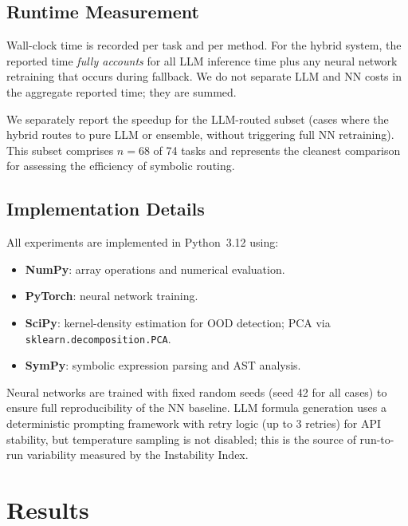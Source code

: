 \documentclass[twoside,11pt]{article}
\begin{document}
\subsection{Runtime Measurement}\label{subsec:runtime-measurement}
\label{sec:timing_setup}

Wall-clock time is recorded per task and per method.  For the hybrid system,
the reported time \emph{fully accounts} for all LLM inference time plus any
neural network retraining that occurs during fallback.  We do not separate
LLM and NN costs in the aggregate reported time; they are summed.

We separately report the speedup for the LLM-routed subset (cases where the
hybrid routes to pure LLM or ensemble, without triggering full NN retraining).
This subset comprises $n=68$ of 74 tasks and represents the cleanest comparison
for assessing the efficiency of symbolic routing.

\subsection{Implementation Details}\label{subsec:implementation-details}
\label{sec:setup_impl}

All experiments are implemented in Python~3.12 using:
\begin{itemize}
  \item \textbf{NumPy}: array operations and numerical evaluation.
  \item \textbf{PyTorch}: neural network training.
  \item \textbf{SciPy}: kernel-density estimation for OOD detection; PCA via
    \texttt{sklearn.decomposition.PCA}.
  \item \textbf{SymPy}: symbolic expression parsing and AST analysis.
\end{itemize}

Neural networks are trained with fixed random seeds (seed 42 for all cases) to
ensure full reproducibility of the NN baseline.  LLM formula generation uses a
deterministic prompting framework with retry logic (up to 3 retries) for API
stability, but temperature sampling is not disabled; this is the source of
run-to-run variability measured by the Instability Index.

\section{Results}
\label{sec:results}
\end{document}
